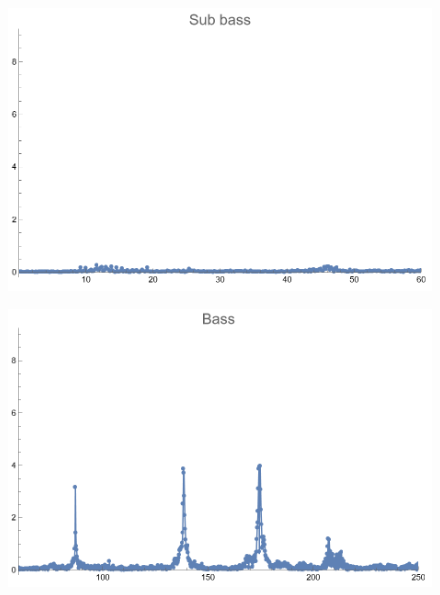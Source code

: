 \documentclass[12pt, letterpaper]{article}
\begin{document}
\begin{figure}[H]
  \centering
  \begin{minipage}{.5\textwidth}
    \centering
    \includegraphics[width=.9\linewidth]{imgs/Cancion8/subbass.png}
    \label{fig:08b}
  \end{minipage}%
  \begin{minipage}{.5\textwidth}
    \centering
    \includegraphics[width=.9\linewidth]{imgs/Cancion8/bass.png}
    \label{fig:08c}
  \end{minipage}
\end{figure}
\end{document}
